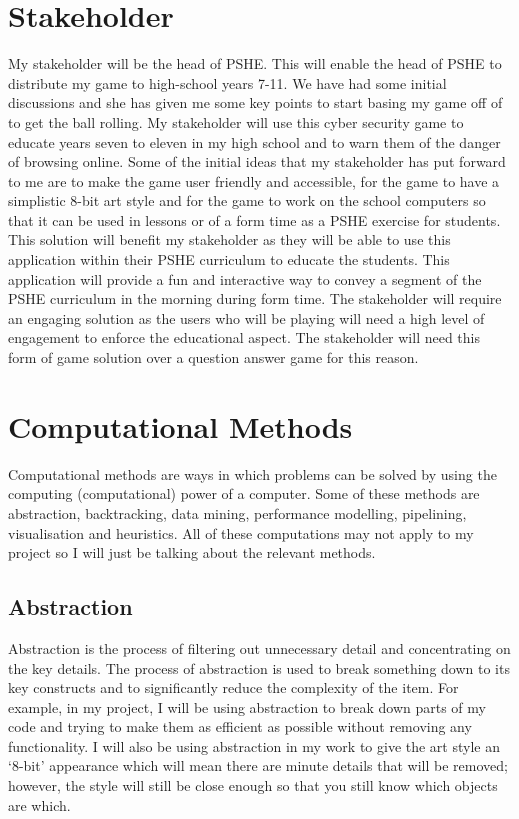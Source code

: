 \documentclass[12pt]{report}
\begin{document}
\section{Stakeholder}
My stakeholder will be the head of PSHE. This will enable the head of PSHE to distribute my game to high-school years 7-11. We have had some initial discussions and she has given me some key points to start basing my game off of to get the ball rolling. My stakeholder will use this cyber security game to educate years seven to eleven in my high school and to warn them of the danger of browsing online. Some of the initial ideas that my stakeholder has put forward to me are to make the game user friendly and accessible, for the game to have a simplistic 8-bit art style and for the game to work on the school computers so that it can be used in lessons or of a form time as a PSHE exercise for students. 
\newline
\newline
This solution will benefit my stakeholder as they will be able to use this application within their PSHE curriculum to educate the students. This application will provide a fun and interactive way to convey a segment of the PSHE curriculum in the morning during form time. The stakeholder will require an engaging solution as the users who will be playing will need a high level of engagement to enforce the educational aspect. The stakeholder will need this form of game solution over a  question answer game for this reason.

\pagebreak

\section{Computational Methods}
Computational methods are ways in which problems can be solved by using the computing (computational) power of a computer. Some of these methods are abstraction, backtracking, data mining, performance modelling, pipelining, visualisation and heuristics. All of these computations may not apply to my project so I will just be talking about the relevant methods. 

\subsection{Abstraction}
Abstraction is the process of filtering out unnecessary detail and concentrating on the key details. The process of abstraction is used to break something down to its key constructs and to significantly reduce the complexity of the item. For example, in my project, I will be using abstraction to break down parts of my code and trying to make them as efficient as possible without removing any functionality. I will also be using abstraction in my work to give the art style an ‘8-bit’ appearance which will mean there are minute details that will be removed; however, the style will still be close enough so that you still know which objects are which.
\end{document}
